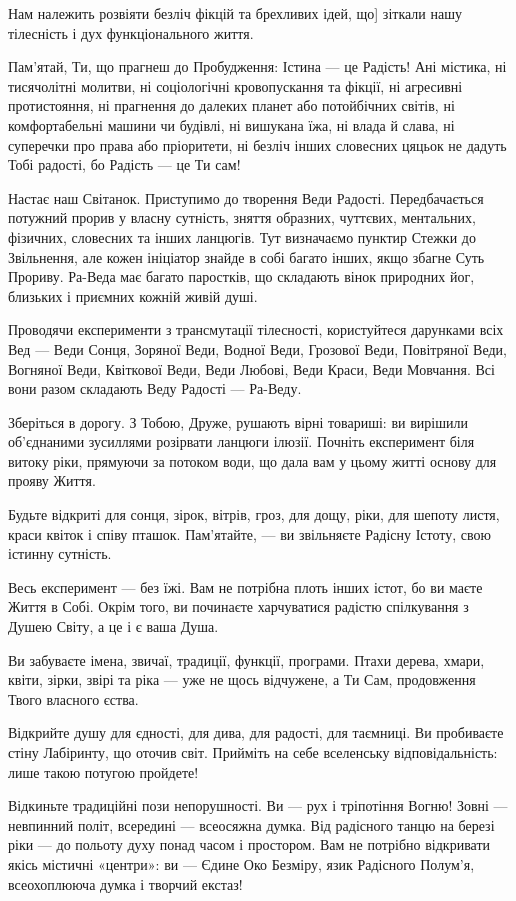 Нам належить розвіяти безліч фікцій та брехливих ідей, що] зіткали нашу
тілесність і дух функціонального життя.

Пам’ятай, Ти, що прагнеш до Пробудження: Істина — це Радість! Ані містика, ні
тисячолітні молитви, ні соціологічні кровопускання та фікції, ні агресивні
протистояння, ні прагнення до далеких планет або потойбічних світів, ні
комфортабельні машини чи будівлі, ні вишукана їжа, ні влада й слава, ні
суперечки про права або пріоритети, ні безліч інших словесних цяцьок не дадуть
Тобі радості, бо Радість — це Ти сам!

Настає наш Світанок. Приступимо до творення Веди Радості. Передбачається
потужний прорив у власну сутність, зняття образних, чуттєвих, ментальних,
фізичних, словесних та інших ланцюгів. Тут визначаємо пунктир Стежки до
Звільнення, але кожен ініціатор знайде в собі багато інших, якщо збагне Суть
Прориву. Ра-Веда має багато паростків, що складають вінок природних йог,
близьких і приємних кожній живій душі.

Проводячи експерименти з трансмутації тілесності, користуйтеся дарунками всіх
Вед — Веди Сонця, Зоряної Веди, Водної Веди, Грозової Веди, Повітряної Веди,
Вогняної Веди, Квіткової Веди, Веди Любові, Веди Краси, Веди Мовчання. Всі вони
разом складають Веду Радості — Ра-Веду.

Зберіться в дорогу. З Тобою, Друже, рушають вірні товариші: ви вирішили
об’єднаними зусиллями розірвати ланцюги ілюзії. Почніть експеримент біля витоку
ріки, прямуючи за потоком води, що дала вам у цьому житті основу для прояву
Життя.

Будьте відкриті для сонця, зірок, вітрів, гроз, для дощу, ріки, для шепоту
листя, краси квіток і співу пташок. Пам’ятайте, — ви звільняєте Радісну Істоту,
свою істинну сутність.

Весь експеримент — без їжі. Вам не потрібна плоть інших істот, бо ви маєте
Життя в Собі. Окрім того, ви починаєте харчуватися радістю спілкування з Душею
Світу, а це і є ваша Душа.

Ви забуваєте імена, звичаї, традиції, функції, програми. Птахи дерева, хмари,
квіти, зірки, звірі та ріка — уже не щось відчужене, а Ти Сам, продовження
Твого власного єства.

Відкрийте душу для єдності, для дива, для радості, для таємниці. Ви пробиваєте
стіну Лабіринту, що оточив світ. Прийміть на себе вселенську відповідальність:
лише такою потугою пройдете!

Відкиньте традиційні пози непорушності. Ви — рух і тріпотіння Вогню! Зовні —
невпинний політ, всередині — всеосяжна думка. Від радісного танцю на березі
ріки — до польоту духу понад часом і простором. Вам не потрібно відкривати
якісь містичні «центри»: ви — Єдине Око Безміру, язик Радісного Полум’я,
всеохоплююча думка і творчий екстаз!

